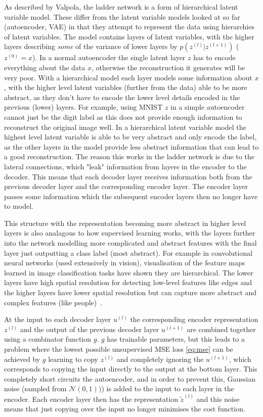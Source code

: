 \documentclass[12pt,a4paper,twoside,openright]{report}
\begin{document}
As described by Valpola, the ladder network is a form of hierarchical latent variable model. These differ from the latent variable models
looked at so far (autoencoder, VAE) in that they attempt to represent the data using hierarchies of latent variables. The model contains
layers of latent variables, with the higher layers describing \textit{some} of the variance of lower layers by $p(z^{(l)}|z^{(l+1)})$ ($z^{(0)} = x$). 
In a normal autoencoder the single latent layer $z$ has to encode everything about the data $x$, otherwise the reconstruction it generates 
will be very poor. With a hierarchical model each layer models some information about $x$, with the higher level latent variables 
(further from the data) able to be more abstract, as they don't have to encode the lower level details encoded in the previous (lower) layers. For example, using MNIST $z$ in a simple
autoencoder cannot just be the digit label as this does not provide enough information to reconstruct the original image well. In a hierarchical latent variable model the highest
level latent variable is able to be very abstract and only encode the label, as the other layers in the model provide less abstract information that can lead to a good reconstruction.
The reason this works in the ladder network is due to the lateral connections, which "leak" information from layers in the encoder to the decoder. This means that each decoder layer
receives information both from the previous decoder layer and the corresponding encoder layer. The encoder layer passes some information which
the subsequent encoder layers then no longer have to model.

This structure with the representation becoming more abstract in higher level layers is also analagous to how supervised learning works, with the layers 
further into the network modelling more complicated and abstract features with the final layer just outputting a class label (most abstract). For example in convolutional
neural networks (used extensively in vision), visualisation of the feature maps learned in image classification tasks have shown they are hierarchical. The lower layers
have high spatial resolution for detecting low-level features like edges and the higher layers have lower spatial resolution but can capture more abstract and complex features
(like people)~\cite{conv_hierarch}.

At the input to each decoder layer $u^{(l)}$ the corresponding encoder representation $z^{(l)}$ and the output of the previous decoder layer $u^{(l+1)}$ are combined together
using a combinator function $g$. $g$ has trainable parameters, but this leads to a problem where the lowest possible unsupervised MSE loss \eqref{eq:mse} can be 
achieved by $g$ learning to copy $z^{(l)}$ and completely ignoring the $u^{(l+1)}$, which corresponds to copying the input directly to the output at the bottom layer.
This completely short circuits the autoencoder, and in order to prevent this, Gaussian noise (sampled from $\mathcal{N}(0, 1))$) is added to the input to each layer 
in the encoder. Each encoder layer then has the representation $\tilde{z}^{(l)}$ and this noise means that just copying over the input no longer minimises the cost function. 
\end{document}
